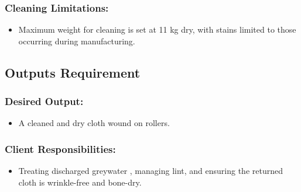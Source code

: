 \documentclass[table]{rapportCS}
\begin{document}
  \subsubsection{ Cleaning Limitations:}\label{sec:cleanlim}
    \begin{itemize}[label=$\bullet$]
      \item Maximum weight for cleaning is set at 11 kg dry, with stains limited to those occurring during manufacturing.
    \end{itemize}


\subsection{ Outputs Requirement}\label{sec:outputreq}
\subsubsection{ Desired Output:}\label{sec:desout}
    \begin{itemize}[label=$\bullet$]
      \item A cleaned and dry cloth wound on rollers.
    \end{itemize}
    
\subsubsection{Client Responsibilities:}\label{sec:clientresp}
    \begin{itemize}[label=$\bullet$]
      \item Treating discharged greywater , managing lint, and ensuring the returned cloth is wrinkle-free and bone-dry.
    \end{itemize}
\end{document}
